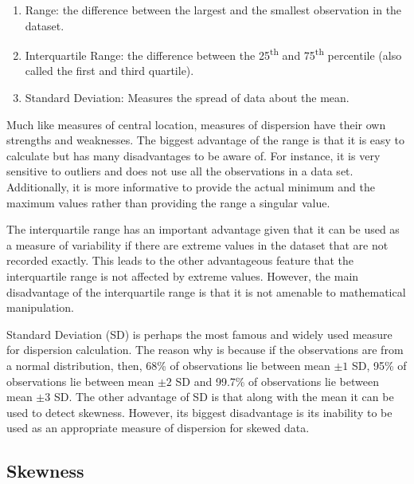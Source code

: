 \begin{enumerate}
    \item Range: the difference between the largest and the smallest observation 
    in the dataset.
    \item Interquartile Range: the difference between the 25\textsuperscript{th} and 
    75\textsuperscript{th} percentile (also called the first and third quartile).
    \item Standard Deviation: Measures the spread of data about the mean. 
\end{enumerate}

Much like measures of central location, measures of dispersion have their own
strengths and weaknesses. The biggest advantage of the range is that it is easy 
to calculate but has many disadvantages to be aware of. For instance, it is very 
sensitive to outliers and does not use all the observations in a data set. Additionally, 
it is more informative to provide the actual minimum and the maximum values rather 
than providing the range a singular value.

The interquartile range has an important advantage given that it can be used as 
a measure of variability if there are extreme values in the dataset that are not 
recorded exactly. This leads to the other advantageous feature that the interquartile 
range is not affected by extreme values. However, the main disadvantage of the 
interquartile range is that it is not amenable to mathematical manipulation.

Standard Deviation (SD) is perhaps the most famous and widely used measure for dispersion
calculation. The reason why is because if the observations are from a normal distribution, 
then, 68\% of observations lie between mean $\pm1$ SD, 95\% of observations lie 
between mean $\pm{2}$ SD and 99.7\% of observations lie between mean $\pm{3}$ SD. 
The other advantage of SD is that along with the mean it can be used to detect 
skewness. However, its biggest disadvantage is its inability to be used as an 
appropriate measure of dispersion for skewed data.

\subsection{Skewness}


